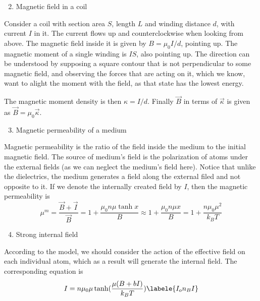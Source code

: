 \begin{enumerate}
\begin{enumerate}
    \setcounter{enumii}{1}
    \item Magnetic field in a coil
\end{enumerate}

\hspace{.5cm}
Consider a coil with section area $S$, length $L$
and winding distance $d$, with current $I$ in it.
The current flows up and counterclockwise when looking from above.
The magnetic field inside it is given by $B = \mu_0 I / d$,
pointing up.
The magnetic moment of a single winding is $IS$, also pointing up.
The direction can be understood by supposing a square contour
that is not perpendicular to some magnetic field,
and observing the forces that are acting on it,
which we know, want to alight the moment with the field,
as that state has the lowest energy.

\hspace{.5cm}
The magnetic moment density is then $\kappa = I / d$.
Finally $\vec{B}$ in terms of $\vec{\kappa}$ is given as
$\vec{B} = \mu_0 \vec{\kappa}$.

\begin{enumerate}
    \setcounter{enumii}{2}
    \item Magnetic permeability of a medium
\end{enumerate}

\hspace{.5cm}
Magnetic permeability is the ratio of the field inside the medium
to the initial magnetic field.
The source of medium's field is the polarization of atoms
under the external fields (as we can neglect the medium's field here).
Notice that unlike the dielectrics,
the medium generates a field along the external filed and not opposite to it.
If we denote the internally created field by $I$,
then the magnetic permeability is
\begin{equation}
    \mu^m = \frac{\vec{B} + \vec{I}}{\vec{B}} =
    1 + \frac{\mu_0 n \mu \tanh{x}}{B} \approx
    1 + \frac{\mu_0 n \mu x}{B} =
    1 + \frac{n \mu_0 \mu^2}{k_B T}
\end{equation}

\begin{enumerate}
    \setcounter{enumii}{3}
    \item Strong internal field
\end{enumerate}

\hspace{.5cm}
According to the model,
we should consider the action of the effective field
on each individual atom,
which as a result will generate the internal field.
The corresponding equation is
\begin{equation}
    I = n \mu_0 \mu \tanh(\frac{\mu (B + bI)}{k_B T})
    \labele{I_on_BI}
\end{equation}


\end{enumerate}
